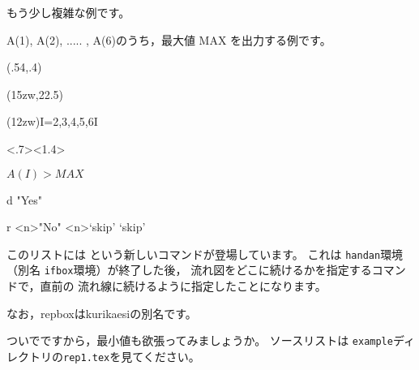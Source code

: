 \documentclass[a4j]{jarticle}
\begin{document}
もう少し複雑な例です。

A(1), A(2), ..... , A(6)のうち，最大値 MAX を出力する例です。

\begin{showEx}(.54,.4){}
\begin{caprm}
\begin{nagarezu}(15zw,22.5\baselineskip)
  \downto
  \downto
  \begin{repbox*}%
      [.5](12zw){I=2,3,4,5,6}{I}%
    \downto
    \begin{ifbox}<.7><1.4>%
          {\strut$A(I)>MAX$}%
      \begin{branch}{d}%
        \downto"Yes"%
        \downto[skip]%
        \pushcurrentP
      \end{branch}%
      \begin{branch}{r}%
        \rightto<n>"No"%
        \downto<n>`skip'%
        \leftto`skip'%
      \end{branch}%
    \end{ifbox}%
  \end{repbox*}%
  \downto
  \downto
\end{nagarezu}%
\end{caprm}
\end{showEx}

このリストには  という新しいコマンドが登場しています。
これは \texttt{handan}環境（別名 \texttt{ifbox}環境）が終了した後，
流れ図をどこに続けるかを指定するコマンドで，直前の
流れ線に続けるように指定したことになります。

なお，\textsf{repbox}は\textsf{kurikaesi}の別名です。

ついでですから，最小値も欲張ってみましょうか。
ソースリストは \texttt{example}ディレクトリの\texttt{rep1.tex}を見てください。

\begin{center}

\end{center}

\clearpage


\printindex
\end{document}
